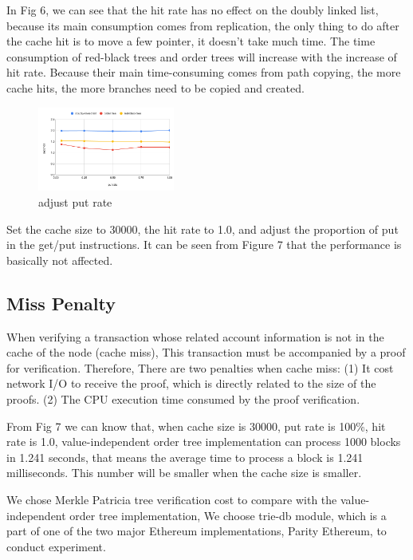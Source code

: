 \documentclass[conference]{IEEEtran}
\begin{document}
In Fig 6, we can see that the hit rate has no effect
on the doubly linked list, because its main consumption
comes from replication, the only thing to do
after the cache hit is to move a few pointer,
it doesn't take much time.
The time consumption of red-black trees and order
trees will increase with the increase of hit rate.
Because their main time-consuming comes from path copying,
the more cache hits, the more branches need
to be copied and created.

\begin{figure}
  \centering
  \includegraphics[width=0.4\textwidth]{adjust_put_rate.png}
  \caption{adjust put rate}
\end{figure}

Set the cache size to 30000, the hit rate to 1.0,
and adjust the proportion of put in the get/put instructions.
It can be seen from Figure 7 that the performance
is basically not affected.

\subsection{Miss Penalty}

When verifying a transaction whose related account information
is not in the cache of the node (cache miss),
This transaction must be accompanied by a proof
for verification. Therefore, There are two penalties when cache miss:
(1) It cost network I/O to receive the proof, which is directly related
to the size of the proofs.
(2) The CPU execution time consumed by the proof verification.

From Fig 7 we can know that, when cache size is 30000,
put rate is 100\%, hit rate is 1.0, value-independent order tree implementation
can process 1000 blocks in 1.241 seconds, that means 
the average time to process a block is 1.241 milliseconds.
This number will be smaller when the cache size is smaller.

We chose Merkle Patricia tree verification cost to compare
with the value-independent order tree implementation,
We choose trie-db module,
which is a part of one of the two major
Ethereum implementations,
Parity Ethereum, to conduct experiment.
\end{document}
